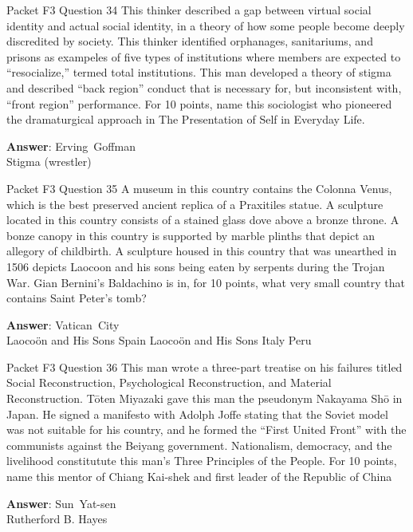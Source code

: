 \begin{frame}{Packet F3 Question 34}
This thinker described a gap between virtual social identity and actual social identity, in a theory of   how some people become deeply discredited by society. This thinker identified orphanages, sanitariums, and prisons as exampeles of five types of institutions where members are expected to ``resocialize,'' termed total institutions. This man   developed a theory of stigma and described ``back region'' conduct that is necessary for, but inconsistent with, ``front region'' performance. For 10 points, name this sociologist who   pioneered the dramaturgical approach in     The Presentation of Self in Everyday Life.

\textbf{Answer}: Erving\ Goffman\\
 Stigma (wrestler)
\end{frame}

\begin{frame}{Packet F3 Question 35}
A museum in this country contains the Colonna Venus, which is the best preserved ancient replica of a Praxitiles statue. A sculpture located in this country consists of a stained glass dove above a bronze throne. A bonze canopy in this country is supported by marble plinths that depict an allegory of childbirth. A sculpture housed in this country that was unearthed in 1506 depicts Laocoon and his sons being eaten by serpents during the Trojan War. Gian Bernini's Baldachino is in,   for 10 points, what very small country that contains Saint Peter's tomb?        

\textbf{Answer}: Vatican\ City\\
 Laocoön and His Sons
 Spain
 Laocoön and His Sons
 Italy
 Peru
\end{frame}

\begin{frame}{Packet F3 Question 36}
This man wrote a three-part treatise on his failures titled Social Reconstruction, Psychological Reconstruction, and Material   Reconstruction. Tōten Miyazaki gave this man the pseudonym Nakayama Shō in Japan.   He signed a manifesto with Adolph Joffe stating that the Soviet model was not suitable for his   country, and he formed the “First United Front” with the communists against the Beiyang government. Nationalism, democracy,   and the livelihood constitutute this man's Three Principles of the People.   For 10 points, name this mentor of Chiang Kai-shek and first leader of the Republic of China

\textbf{Answer}: Sun\ Yat-sen\\
 Rutherford B. Hayes
\end{frame}

